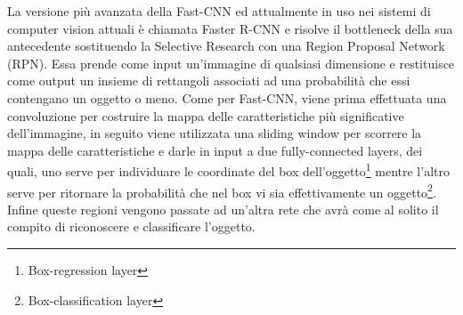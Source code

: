 La versione più avanzata della Fast-CNN ed attualmente in uso nei sistemi di computer vision attuali è chiamata Faster R-CNN e risolve il bottleneck della sua antecedente sostituendo la Selective Research con una Region Proposal Network (RPN). Essa prende come input un'immagine di qualsiasi dimensione e restituisce come output un insieme di rettangoli associati ad una probabilità che essi contengano un oggetto o meno. Come per Fast-CNN, viene prima effettuata una convoluzione per costruire la mappa delle caratteristiche più significative dell'immagine, in seguito viene utilizzata una sliding window per scorrere la mappa delle caratteristiche e darle in input a due fully-connected layers, dei quali, uno serve per individuare le coordinate del box dell'oggetto\footnote{Box-regression layer} mentre l'altro serve per ritornare la probabilità che nel box vi sia effettivamente un oggetto\footnote{Box-classification layer}. Infine queste regioni vengono passate ad un'altra rete che avrà come al solito il compito di riconoscere e classificare l'oggetto.
